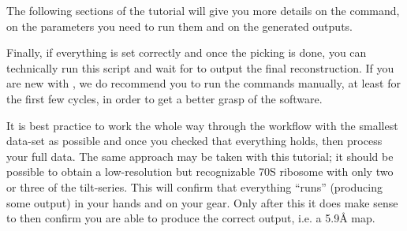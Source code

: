 The following sections of the tutorial will give you more details on the command, on the parameters you need to run them and on the generated outputs.

Finally, if everything is set correctly and once the picking is done, you can technically run this script and wait for {\emClarity} to output the final reconstruction. If you are new with {\emClarity}, we do recommend you to run the commands manually, at least for the first few cycles, in order to get a better grasp of the software.

\begin{tip}It is best practice to work the whole way through the workflow with the smallest data-set as possible and once you checked that everything holds, then process your full data. The same approach may be taken with this tutorial; it should be possible to obtain a low-resolution but recognizable 70S ribosome with only two or three of the tilt-series. This will confirm that everything ``runs'' (producing some output) in your hands and on your gear. Only after this it does make sense to then confirm you are able to produce the correct output, i.e. a 5.9\si{\angstrom} map.
\end{tip}
